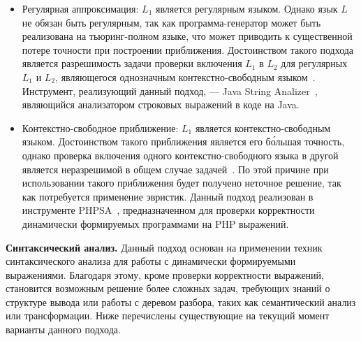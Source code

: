\begin{itemize}
    \item Регулярная аппроксимация: $L_1$ является регулярным языком. Однако язык $L$ не обязан быть регулярным, так как программа-генератор может быть реализована на тьюринг-полном языке, что может приводить к существенной потере точности при построении приближения. Достоинством такого подхода является разрешимость задачи проверки включения $L_1$ в $L_2$ для регулярных $L_1$ и $L_2$, являющегося однозначным контекстно-свободным языком~\cite{LangInclusion}. Инструмент, реализующий данный подход, --- Java String Analizer~\cite{JSA}, являющийся анализатором строковых выражений в коде на Java.

    \item Контекстно-свободное приближение: $L_1$ является контекстно-свободным языком.  Достоинством такого приближения является его б\'{о}льшая точность, однако проверка включения одного контекстно-свободного языка в другой является неразрешимой в общем случае задачей~\cite{LangInclusion}. По  этой причине при использовании такого приближения будет получено неточное решение, так как потребуется применение эвристик. Данный подход реализован в инструменте PHPSA~\cite{PHPSA}, предназначенном для проверки корректности динамически формируемых программами на PHP выражений.

\end{itemize}

\textbf{Синтаксический анализ.} Данный подход основан на применении техник синтаксического анализа для работы с динамически формируемыми выражениями. Благодаря этому, кроме проверки корректности выражений, становится возможным решение более сложных задач, требующих знаний о структуре вывода или работы с деревом разбора, таких как семантический анализ или трансформации. Ниже перечислены существующие на текущий момент варианты данного подхода.

